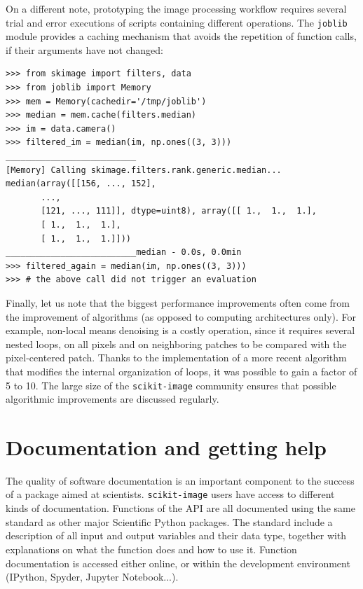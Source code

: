 \documentclass[twocolumn]{bmcart}%
\begin{document}
On a different note, prototyping the image processing workflow requires several trial and error
executions of scripts containing different operations. The \texttt{joblib}
module provides a caching mechanism that avoids the repetition of function
calls, if their arguments have not changed:
\begin{lstlisting}
>>> from skimage import filters, data
>>> from joblib import Memory
>>> mem = Memory(cachedir='/tmp/joblib')
>>> median = mem.cache(filters.median)
>>> im = data.camera()
>>> filtered_im = median(im, np.ones((3, 3)))
__________________________
[Memory] Calling skimage.filters.rank.generic.median...
median(array([[156, ..., 152],
       ..., 
       [121, ..., 111]], dtype=uint8), array([[ 1.,  1.,  1.],
       [ 1.,  1.,  1.],
       [ 1.,  1.,  1.]]))
__________________________median - 0.0s, 0.0min
>>> filtered_again = median(im, np.ones((3, 3)))
>>> # the above call did not trigger an evaluation
\end{lstlisting}

Finally, let us note that the biggest performance improvements often come from
the improvement of algorithms (as opposed to computing architectures only). For
example, non-local means denoising \citep{Buades2005} is a costly operation,
since it requires several nested loops, on all pixels and on neighboring
patches to be compared with the pixel-centered patch. Thanks to the
implementation of a more recent algorithm \citep{Darbon2008} that modifies the
internal organization of loops, it was possible to gain a factor of 5 to 10.
The large size of the \texttt{scikit-image} community ensures that possible
algorithmic improvements are discussed regularly.

\section*{Documentation and getting help}

The quality of software documentation is an important component to the
success of a package aimed at scientists.
\texttt{scikit-image} users have access to different kinds of
documentation. Functions of the API are all
documented using the same standard \citep{Pawlik2015} as other major
Scientific Python packages. The standard include a description of all
input and output variables and their data type, together with
explanations on what the function does and how to use it. Function
documentation is accessed either online, or within the development
environment (IPython, Spyder, Jupyter Notebook...). 
\end{document}
